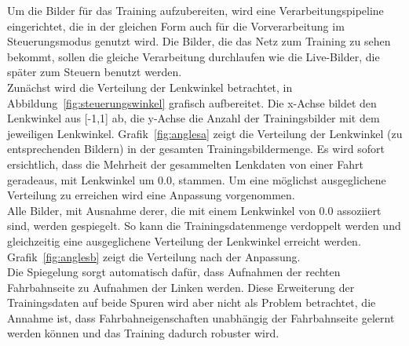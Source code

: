 Um die Bilder für das Training aufzubereiten, wird eine Verarbeitungspipeline eingerichtet, die in der gleichen Form auch für die Vorverarbeitung im Steuerungsmodus genutzt wird. Die Bilder, die das Netz zum Training zu \glqq sehen \grqq{} bekommt, sollen die gleiche Verarbeitung durchlaufen wie die Live-Bilder, die später zum Steuern benutzt werden.\\
Zunächst wird die Verteilung der Lenkwinkel betrachtet, in Abbildung~\ref{fig:steuerungswinkel} grafisch aufbereitet. Die x-Achse bildet den Lenkwinkel aus [-1,1] ab, die y-Achse die Anzahl der Trainingsbilder mit dem jeweiligen Lenkwinkel. Grafik~\ref{fig:anglesa} zeigt die Verteilung der Lenkwinkel (zu entsprechenden Bildern) in der gesamten Trainingsbildermenge. Es wird sofort ersichtlich, dass die Mehrheit der gesammelten Lenkdaten von einer Fahrt geradeaus, mit Lenkwinkel um 0.0, stammen. Um eine möglichst ausgeglichene Verteilung zu erreichen wird eine Anpassung vorgenommen.\\
Alle Bilder, mit Ausnahme derer, die mit einem Lenkwinkel von 0.0 assoziiert sind, werden gespiegelt. So kann die Trainingsdatenmenge verdoppelt werden und gleichzeitig eine ausgeglichene Verteilung der Lenkwinkel erreicht werden. Grafik~\ref{fig:anglesb} zeigt die Verteilung nach der Anpassung.\\
Die Spiegelung sorgt automatisch dafür, dass Aufnahmen der rechten Fahrbahnseite zu Aufnahmen der Linken werden. Diese Erweiterung der Trainingsdaten auf beide Spuren wird aber nicht als Problem betrachtet, die Annahme ist, dass Fahrbahneigenschaften unabhängig der Fahrbahnseite gelernt werden können und das Training dadurch robuster wird.
